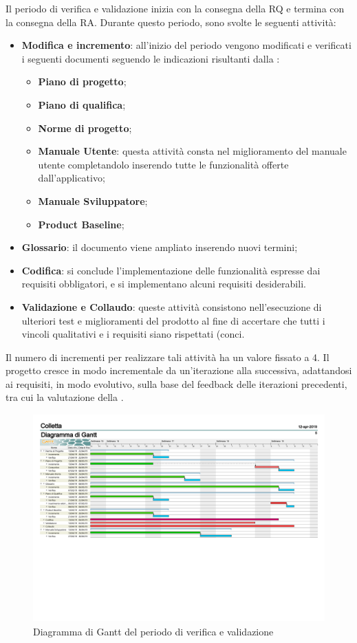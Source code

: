 Il periodo di verifica e validazione inizia con la consegna della RQ e termina con la consegna della RA.\newline
Durante questo periodo, sono svolte le seguenti attività:
\begin{itemize}
	\item \textbf{Modifica e incremento}: all'inizio  del  periodo  vengono  modificati  e  verificati  i seguenti documenti seguendo le indicazioni risultanti dalla \RQ{}:
	\begin{itemize}
		\item \textbf{Piano di progetto};
		\item \textbf{Piano di qualifica};
		\item \textbf{Norme di progetto};
		\item \textbf{Manuale Utente}: questa attività consta nel miglioramento del manuale utente completandolo inserendo tutte le funzionalità offerte dall'applicativo;
		\item \textbf{Manuale Sviluppatore};
		\item \textbf{Product Baseline};
	\end{itemize}
	\item \textbf{Glossario}: il documento viene ampliato inserendo nuovi termini;
	\item \textbf{Codifica}: si conclude l'implementazione delle funzionalità espresse dai requisiti obbligatori, e si implementano alcuni requisiti desiderabili.
	\item \textbf{Validazione e Collaudo}: queste attività consistono nell'esecuzione di ulteriori test e miglioramenti del prodotto al fine di accertare che tutti i vincoli qualitativi e i requisiti siano rispettati (conci.
\end{itemize}
Il numero di incrementi per realizzare tali attività ha un valore fissato a 4.
Il progetto cresce in modo incrementale da un'iterazione alla successiva, adattandosi ai requisiti, in modo evolutivo, sulla base del feedback delle iterazioni precedenti, tra cui la valutazione della \RQ{}.
\begin{figure}[H]
		\hspace*{-1.5cm}
	\includegraphics[width=19.4cm, height=8cm]{Pianificazione/verificaValidazione.pdf}
	\caption{Diagramma di Gantt del periodo di verifica e validazione}
\end{figure}